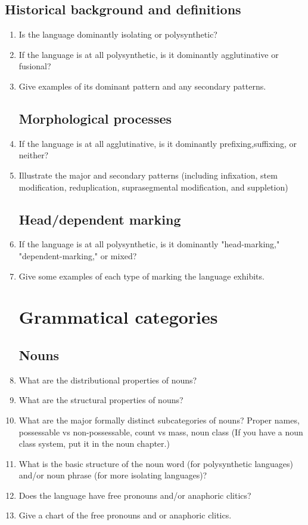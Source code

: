 \documentclass[twocolumn]{scrartcl}
\begin{document}
\subsection{Historical background and definitions}
\begin{enumerate}[resume]
\item Is the language dominantly isolating or polysynthetic?
\item If the language is at all polysynthetic, is it dominantly agglutinative or fusional?
\item Give examples of its dominant pattern and any secondary patterns.
\subsection{Morphological processes}
\item If the language is at all agglutinative, is it dominantly prefixing,suffixing, or neither?
\item Illustrate the major and secondary patterns (including infixation, stem modification, reduplication, suprasegmental modification, and suppletion)
\subsection{Head/dependent marking}
\item If the language is at all polysynthetic, is it dominantly "head-marking," "dependent-marking," or mixed?
\item Give some examples of each type of marking the language exhibits.
\section{Grammatical categories}
\subsection{Nouns}
\item What are the distributional properties of nouns? 
\item What are the structural properties of nouns?
\item What are the major formally distinct subcategories of nouns? 
\subitem Proper names, possessable vs non-possessable, count vs mass, noun class (If you have a noun class system, put it in the noun chapter.)
\item What is the basic structure of the noun word (for polysynthetic languages) and/or noun phrase (for more isolating languages)?
\item Does the language have free pronouns and/or anaphoric clitics? 
\item Give a chart of the free pronouns and or anaphoric clitics.

\end{enumerate}
\end{document}
